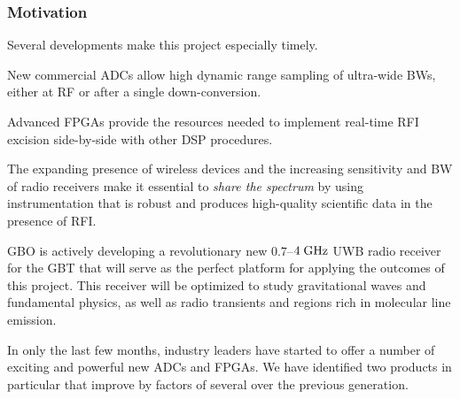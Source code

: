 \documentclass[10pt]{myNSF}
\begin{document}
\subsubsection{Motivation}
\label{sec:motivation}

Several developments make this project especially timely.
\vspace{-1.0em}
\begin{itemize*}
\item{New commercial ADCs allow high dynamic range sampling of
  ultra-wide BWs, either at RF or after a single down-conversion.}
\item{Advanced FPGAs provide the resources needed to implement
  real-time RFI excision side-by-side with other DSP procedures.}
\item{The expanding presence of wireless devices and the increasing
  sensitivity and BW of radio receivers make it essential to
  \emph{share the spectrum} by using instrumentation that is robust
  and produces high-quality scientific data in the presence of RFI.}
\item{GBO is actively developing a revolutionary new $0.7$--$4\; \textrm{GHz}$
  UWB radio receiver for the GBT that will serve as the perfect
  platform for applying the outcomes of this project.  This receiver
  will be optimized to study gravitational waves and fundamental
  physics, as well as radio transients and regions rich in molecular
  line emission.}
\end{itemize*}

\label{sec:hardware}

In only the last few months, industry leaders have started to offer a
number of exciting and powerful new ADCs and FPGAs.  We have
identified two products in particular that improve by factors of
several over the previous generation.
\end{document}

